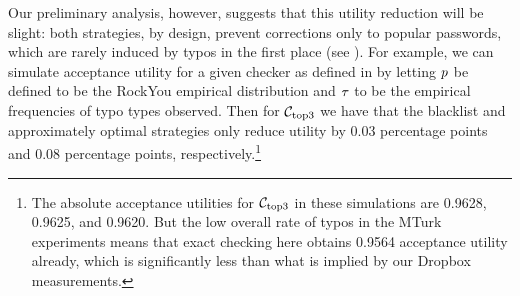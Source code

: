 Our preliminary analysis, however, suggests that this utility reduction will be
slight: both strategies, by design, prevent corrections only to popular
passwords, which are rarely induced by typos in the first place (see
).  For example, we can simulate acceptance utility for a
given checker as defined in  by letting $p$ be defined
to be the RockYou empirical distribution and $\tau$ to be the empirical
frequencies of typo types observed.  Then for ${\mathcal C}_{\textrm{top3}}$  we have that the
blacklist and approximately optimal strategies only reduce utility by 0.03
percentage points and 0.08 percentage points, respectively.\footnote{The
absolute acceptance utilities for ${\mathcal C}_{\textrm{top3}}$ in these simulations are 0.9628,
0.9625, and 0.9620. But the low overall rate of typos in the MTurk experiments
means that exact checking here obtains 0.9564 acceptance utility already, which
is significantly less than what is implied by our Dropbox measurements.}


